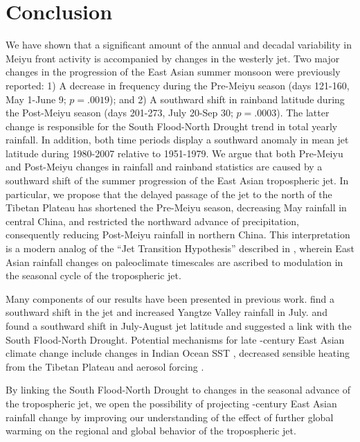 	

		 
\section{Conclusion}

	We have shown that a significant amount of the annual and decadal variability in Meiyu front activity is accompanied by changes in the westerly jet. Two major changes in the progression of the East Asian summer monsoon were previously reported: 1) A decrease in frequency during the Pre-Meiyu season (days 121-160, May 1-June 9; $p=.0019$); and 2) A southward shift in rainband latitude during the Post-Meiyu season (days 201-273, July 20-Sep 30; $p=.0003$). The latter change is responsible for the South Flood-North Drought trend in total yearly rainfall. In addition, both time periods display a southward anomaly in mean jet latitude during 1980-2007 relative to 1951-1979. We argue that both Pre-Meiyu and Post-Meiyu changes in rainfall and rainband statistics are caused by a southward shift of the summer progression of the East Asian tropospheric jet. In particular, we propose that the delayed passage of the jet to the north of the Tibetan Plateau has shortened the Pre-Meiyu season, decreasing May rainfall in central China, and restricted the northward advance of precipitation, consequently reducing Post-Meiyu rainfall in northern China. This interpretation is a modern analog of the ``Jet Transition Hypothesis'' described in \citet{Chiang2015}, wherein East Asian rainfall changes on paleoclimate timescales are ascribed to modulation in the seasonal cycle of the tropospheric jet. 	
 
	Many components of our results have been presented in previous work. \citet{Xuan2011} find a southward shift in the jet and increased Yangtze Valley rainfall in July. \citet{Yu2004} and \citet{Yu2007} found a southward shift in July-August jet latitude and suggested a link with the South Flood-North Drought. Potential mechanisms for late -century East Asian climate change include changes in Indian Ocean SST \citep{Qu2012}, decreased sensible heating from the Tibetan Plateau \citep{Liu2012a,Hu2015} and aerosol forcing \citep{Song2014}.
	
 By linking the South Flood-North Drought to changes in the seasonal advance of the tropospheric jet, we open the possibility of projecting -century East Asian rainfall change by improving our understanding of the effect of further global warming on the regional and global behavior of the tropospheric jet.
	
